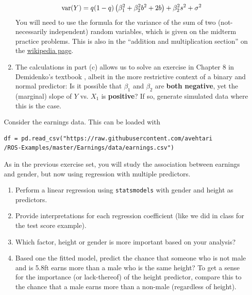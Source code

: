\begin{exercise}
\begin{enumerate}[label=(\alph*)]
\begin{equation*}
{\rm var}(Y) = q(1-q)\left(\beta_1^2 + \beta_2^2b^2 + 2 b \right) + \beta_2^2s^2
+ \sigma^2
\end{equation*}
You will need to use the formula for the variance of the sum of two (not-necessarily independent) random variables, which is given on the midterm practice problems.  
This is also in the ``addition and multiplication section'' on the \href{https://en.wikipedia.org/wiki/Variance#Properties}{wikipedia  page}.
\item The calculations in part (c) allows us to solve an exercise in Chapter 8 in Demidenko's textbook \cite{demidenko2019advanced}, albeit in the more restrictive  context of a binary and normal predictor: 
Is it possible that $\beta_1$ and $\beta_2$ are {\bf both negative}, yet the (marginal) slope of $Y$ vs. $X_1$ is {\bf positive}? If so, generate simulated data where this is the case. 
\end{enumerate}
\end{exercise}





\begin{exercise} Consider the earnings data. This can be loaded with 
\begin{Verbatim}
df = pd.read_csv("https://raw.githubusercontent.com/avehtari
/ROS-Examples/master/Earnings/data/earnings.csv")
\end{Verbatim}
As in the previous exercise set, you will study the association between earnings and gender, but now using regression with multiple predictors. 

\begin{enumerate}[label=(\alph*)]
\item Perform a linear regression using \verb!statsmodels! with gender and height as predictors. 
\item Provide interpretations for each regression coefficient (like we did in class for the test score example). 
\item Which factor, height or gender is more important based on your analysis? 
\item Based one the fitted model, predict the chance that someone who is not male and is 5.8ft earns more than a male who is the same height? To get a sense for the importance (or lack-thereof) of the height predictor, compare this to the chance that a male earns more than a non-male (regardless of height).
\end{enumerate}
\end{exercise}

